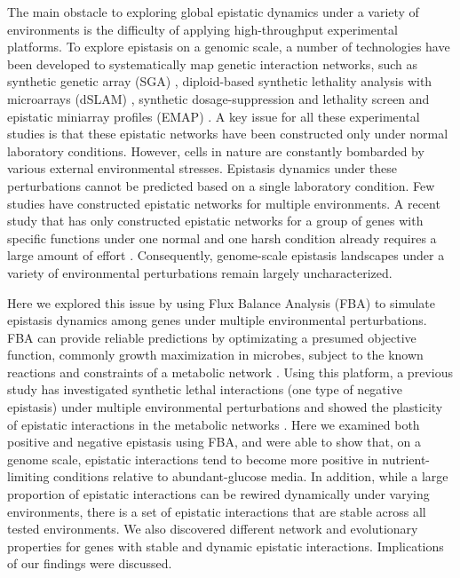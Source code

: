 \documentclass[10pt]{article}
\newcommand{\citep}{\cite}
\begin{document}
The main obstacle to exploring global epistatic dynamics under a
variety of environments is the difficulty of applying high-throughput
experimental platforms. To explore epistasis on a genomic scale, a
number of technologies have been developed to systematically map
genetic interaction networks, such as synthetic genetic array (SGA)
\citep{Tong2004, Costanzo2010}, diploid-based synthetic lethality
analysis with microarrays (dSLAM) \citep{Pan2004, Pan2006}, synthetic
dosage-suppression and lethality screen \citep{Measday2002,
Measday2005, Sopko2006} and epistatic miniarray profiles (EMAP)
\citep{Collins2007, Fiedler2009, Kornmann2009}. A key issue for all
these experimental studies is that these epistatic networks have been
constructed only under normal laboratory
conditions. However, cells in nature are constantly bombarded by various
external environmental stresses. Epistasis dynamics under these
perturbations cannot be predicted based on a single laboratory
condition. Few studies have constructed epistatic networks for
multiple environments. A recent study that has only
constructed epistatic networks for a group of genes with specific
functions under one normal and one harsh condition already requires a
large amount of effort \citep{Bandyopadhyay2011}. Consequently,
genome-scale epistasis landscapes under a variety of environmental
perturbations remain largely uncharacterized.

Here we explored this issue by using Flux Balance Analysis (FBA) to
simulate epistasis dynamics among genes under multiple environmental
perturbations. FBA can provide reliable predictions by 
optimizating a presumed objective function,
commonly growth maximization in microbes, subject to the known reactions and
constraints of a metabolic network \citep{Edwards2001, Shlomi2005, Becker2007, Feist2008,
Smallbone2009a, Orth2010}. Using this platform, a previous study has
investigated synthetic lethal interactions (one type of negative
epistasis) under multiple environmental perturbations and showed the
plasticity of epistatic interactions in the metabolic networks
\citep{Harrison2007}. Here we examined both positive and negative
epistasis using FBA,
and were able to show that, on a genome scale, epistatic interactions
tend to become more positive in nutrient-limiting conditions relative
to abundant-glucose media. In addition, while a large proportion of
epistatic interactions can be rewired dynamically under varying
environments, there is a set of epistatic interactions that are
stable across all tested environments. We also discovered different
network and evolutionary properties for genes with stable and dynamic
epistatic interactions. Implications of our findings were discussed.
\end{document}

